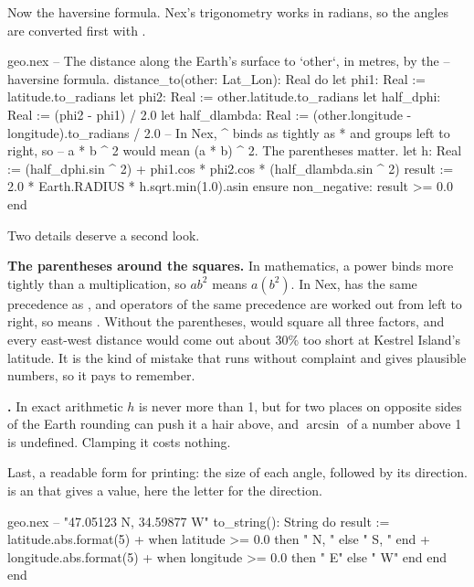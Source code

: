 Now the haversine formula. Nex's trigonometry works in radians, so the
angles are converted first with .

\begin{continued}{geo.nex}
  -- The distance along the Earth's surface to `other`, in metres, by the
  -- haversine formula.
  distance_to(other: Lat_Lon): Real do
    let phi1: Real := latitude.to_radians
    let phi2: Real := other.latitude.to_radians
    let half_dphi: Real := (phi2 - phi1) / 2.0
    let half_dlambda: Real := (other.longitude - longitude).to_radians / 2.0
    -- In Nex, ^ binds as tightly as * and groups left to right, so
    -- a * b ^ 2 would mean (a * b) ^ 2. The parentheses matter.
    let h: Real := (half_dphi.sin ^ 2)
      + phi1.cos * phi2.cos * (half_dlambda.sin ^ 2)
    result := 2.0 * Earth.RADIUS * h.sqrt.min(1.0).asin
  ensure
    non_negative: result >= 0.0
  end
\end{continued}

Two details deserve a second look.

\textbf{The parentheses around the squares.} In mathematics, a power
binds more tightly than a multiplication, so $ab^2$ means $a(b^2)$. In
Nex, \code{^} has the same precedence as \code{*}, and operators of the
same precedence are worked out from left to right, so
 means . Without the parentheses,
 would square all three
factors, and every east-west distance would come out about 30\% too short
at Kestrel Island's latitude. It is the kind of mistake that runs without
complaint and gives plausible numbers, so it pays to remember.

\textbf{.} In exact arithmetic $h$ is never more
than 1, but for two places on opposite sides of the Earth rounding can push
it a hair above, and $\arcsin$ of a number above 1 is undefined. Clamping
it costs nothing.

Last, a readable form for printing: the size of each angle, followed by its
direction.  is an  that gives
a value, here the letter for the direction.

\begin{continued}{geo.nex}
  -- "47.05123 N, 34.59877 W"
  to_string(): String do
    result := latitude.abs.format(5) + when latitude >= 0.0 then " N, " else " S, " end
      + longitude.abs.format(5) + when longitude >= 0.0 then " E" else " W" end
  end
end
\end{continued}

